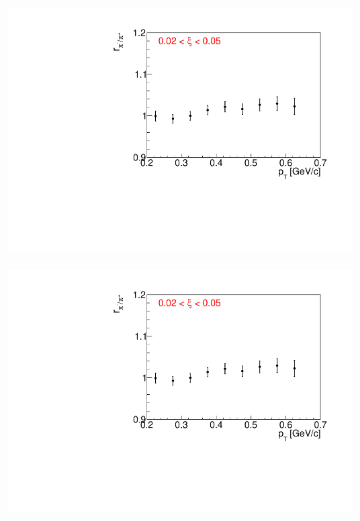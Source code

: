 \begin{figure}[h!]
\begin{subfigure}{.32\textwidth}
	\end{subfigure}
	\begin{subfigure}{.32\textwidth}
		\includegraphics[width=\linewidth, page=8]{chapters/chrgSTAR/img/dEdx/fit2019_fitResult_0_0_step_0.pdf}
	\end{subfigure}
	\begin{subfigure}{.32\textwidth}
		\includegraphics[width=\linewidth, page=11]{chapters/chrgSTAR/img/dEdx/fit2019_fitResult_0_0_step_0.pdf}
	\end{subfigure}
	\begin{subfigure}{.32\textwidth}

\end{subfigure}
\end{figure}
